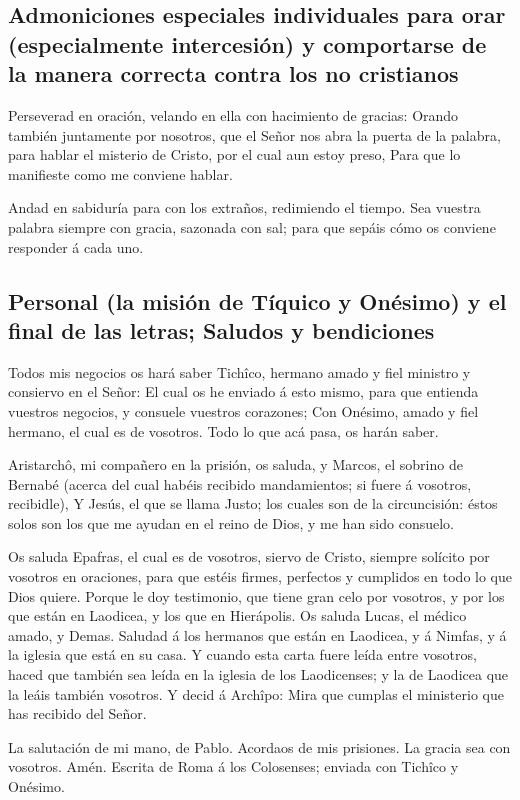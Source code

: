 \hypertarget{admoniciones-especiales-individuales-para-orar-especialmente-intercesiuxf3n-y-comportarse-de-la-manera-correcta-contra-los-no-cristianos}{%
\subsection{Admoniciones especiales individuales para orar
(especialmente intercesión) y comportarse de la manera correcta contra
los no
cristianos}\label{admoniciones-especiales-individuales-para-orar-especialmente-intercesiuxf3n-y-comportarse-de-la-manera-correcta-contra-los-no-cristianos}}

 Perseverad en oración, velando en ella con hacimiento de
gracias:  Orando también juntamente por nosotros, que el
Señor nos abra la puerta de la palabra, para hablar el misterio de
Cristo, por el cual aun estoy preso,  Para que lo
manifieste como me conviene hablar.

 Andad en sabiduría para con los extraños, redimiendo el
tiempo.  Sea vuestra palabra siempre con gracia, sazonada
con sal; para que sepáis cómo os conviene responder á cada uno.

\hypertarget{personal-la-misiuxf3n-de-tuxedquico-y-onuxe9simo-y-el-final-de-las-letras-saludos-y-bendiciones}{%
\subsection{Personal (la misión de Tíquico y Onésimo) y el final de las
letras; Saludos y
bendiciones}\label{personal-la-misiuxf3n-de-tuxedquico-y-onuxe9simo-y-el-final-de-las-letras-saludos-y-bendiciones}}

 Todos mis negocios os hará saber Tichîco, hermano amado y
fiel ministro y consiervo en el Señor:  El cual os he
enviado á esto mismo, para que entienda vuestros negocios, y consuele
vuestros corazones;  Con Onésimo, amado y fiel hermano, el
cual es de vosotros. Todo lo que acá pasa, os harán saber.

 Aristarchô, mi compañero en la prisión, os saluda, y
Marcos, el sobrino de Bernabé (acerca del cual habéis recibido
mandamientos; si fuere á vosotros, recibidle),  Y Jesús,
el que se llama Justo; los cuales son de la circuncisión: éstos solos
son los que me ayudan en el reino de Dios, y me han sido consuelo.

 Os saluda Epafras, el cual es de vosotros, siervo de
Cristo, siempre solícito por vosotros en oraciones, para que estéis
firmes, perfectos y cumplidos en todo lo que Dios quiere.
 Porque le doy testimonio, que tiene gran celo por
vosotros, y por los que están en Laodicea, y los que en Hierápolis.
 Os saluda Lucas, el médico amado, y Demas.
 Saludad á los hermanos que están en Laodicea, y á
Nimfas, y á la iglesia que está en su casa.  Y cuando
esta carta fuere leída entre vosotros, haced que también sea leída en la
iglesia de los Laodicenses; y la de Laodicea que la leáis también
vosotros.  Y decid á Archîpo: Mira que cumplas el
ministerio que has recibido del Señor.

 La salutación de mi mano, de Pablo. Acordaos de mis
prisiones. La gracia sea con vosotros. Amén. Escrita de Roma á los
Colosenses; enviada con Tichîco y Onésimo.
